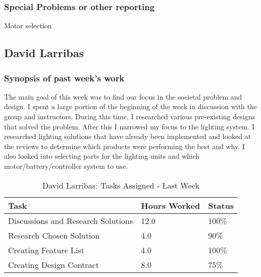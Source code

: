 \documentclass[12pt,article,compsoc]{IEEEtran}
\begin{document}
	\subsubsection*{Special Problems or other reporting}
	Motor selection 

\subsection{David Larribas}

	\subsubsection*{Synopsis of past week's work}

	The main goal of this week was to find our focus in the societal problem and design. I spent a large portion
    of the beginning of the week in discussion with the group and instructors. During this time, I researched
    various pre-existing designs that solved the problem. After this I narrowed my focus to the lighting system. 
    I researched lighting solutions that have already been implemented and looked at the reviews to determine which 
    products were performing the best and why. I also looked into selecting parts for the lighting units and which
    motor/battery/controller system to use.  

	\begin{table}[ht]
	\renewcommand{\arraystretch}{1.3}
		\caption{David Larribas: Tasks Assigned - Last Week}
		
		\label{Summary of David Larribas' activities: last week}
		
		\centering
		\begin{tabular}{p{5.5cm}|p{1cm}|p{1cm}}
		\hline
		\bfseries 	Task		 	                        	& \bfseries Hours Worked	& \bfseries Status	\\
		\hline\hline
					Discussions and Research Solutions			& 12.0				    	& 100\%				\\	
					Research Chosen Solution					& 4.0						& 90\%              \\
                    Creating Feature List                       & 4.0                       & 100\%             \\
                    Creating Design Contract                    & 8.0                       & 75\%              \\	
		\hline
		\end{tabular}
	\end{table}
\end{document}

